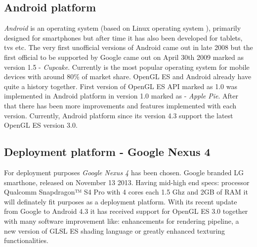 \subsection{Android platform}
\emph{Android} \cite{androidcom} is an operating system (based on Linux operating system \cite{gnulinux}), primarily designed for smartphones but after time it has also been developed for tablets, tvs etc.
The very first unofficial versions of Android came out in late 2008 but the first official to be supported by Google came out on April 30th 2009 marked as version 1.5 - \emph{Cupcake}.
\newline Currently is the most popular operating system for mobile devices with around 80\% of market share.
OpenGL ES and Android already have quite a history together.
First version of OpenGL ES API marked as 1.0 was implemented in Android platform in version 1.0 marked as - \emph{Apple Pie}.
After that there has been more improvements and features implemented with each version.
Currently, Android platform since its version 4.3 support the latest OpenGL ES version 3.0.

\subsection{Deployment platform - Google Nexus 4}
For deployment purposes \emph{Google Nexus 4} has been chosen.
Google branded LG smarthone, released on November 13 2013.
\newline Having mid-high end specs: processor Qualcomm Snapdragon™ S4 Pro with 4 cores each 1.5 Ghz and 2GB of RAM it will definately fit purposes as a deployment platform.
\newline With its recent update from Google to Android 4.3 it has received support for OpenGL ES 3.0 together with many software improvement like: enhancements for rendering pipeline, a new version of GLSL ES shading language or greatly enhanced texturing functionalities.